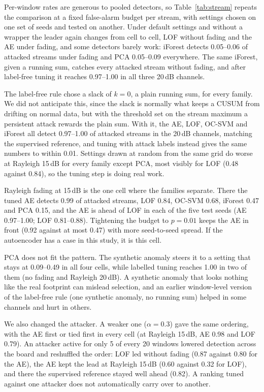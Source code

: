 \documentclass[conference]{IEEEtran}
\begin{document}
Per-window rates are generous to pooled detectors, so Table~\ref{tab:stream} repeats the comparison at a fixed false-alarm budget per stream, with settings chosen on one set of seeds and tested on another. Under default settings and without a wrapper the leader again changes from cell to cell, LOF without fading and the AE under fading, and some detectors barely work: iForest detects 0.05--0.06 of attacked streams under fading and PCA 0.05--0.09 everywhere. The same iForest, given a running sum, catches every attacked stream without fading, and after label-free tuning it reaches 0.97--1.00 in all three 20\,dB channels.

The label-free rule chose a slack of $k=0$, a plain running sum, for every family. We did not anticipate this, since the slack is normally what keeps a CUSUM from drifting on normal data, but with the threshold set on the stream maximum a persistent attack rewards the plain sum. With it, the AE, LOF, OC-SVM and iForest all detect 0.97--1.00 of attacked streams in the 20\,dB channels, matching the supervised reference, and tuning with attack labels instead gives the same numbers to within 0.01. Settings drawn at random from the same grid do worse at Rayleigh 15\,dB for every family except PCA, most visibly for LOF (0.48 against 0.84), so the tuning step is doing real work.

Rayleigh fading at 15\,dB is the one cell where the families separate. There the tuned AE detects 0.99 of attacked streams, LOF 0.84, OC-SVM 0.68, iForest 0.47 and PCA 0.15, and the AE is ahead of LOF in each of the five test seeds (AE 0.97--1.00; LOF 0.81--0.88). Tightening the budget to $p=0.01$ keeps the AE in front (0.92 against at most 0.47) with more seed-to-seed spread. If the autoencoder has a case in this study, it is this cell.

PCA does not fit the pattern. The synthetic anomaly steers it to a setting that stays at 0.09--0.49 in all four cells, while labelled tuning reaches 1.00 in two of them (no fading and Rayleigh 20\,dB). A synthetic anomaly that looks nothing like the real footprint can mislead selection, and an earlier window-level version of the label-free rule (one synthetic anomaly, no running sum) helped in some channels and hurt in others.

We also changed the attacker. A weaker one ($\alpha=0.3$) gave the same ordering, with the AE first or tied first in every cell (at Rayleigh 15\,dB, AE 0.98 and LOF 0.79). An attacker active for only 5 of every 20 windows lowered detection across the board and reshuffled the order: LOF led without fading (0.87 against 0.80 for the AE), the AE kept the lead at Rayleigh 15\,dB (0.60 against 0.32 for LOF), and there the supervised reference stayed well ahead (0.82). A ranking tuned against one attacker does not automatically carry over to another.
\end{document}

